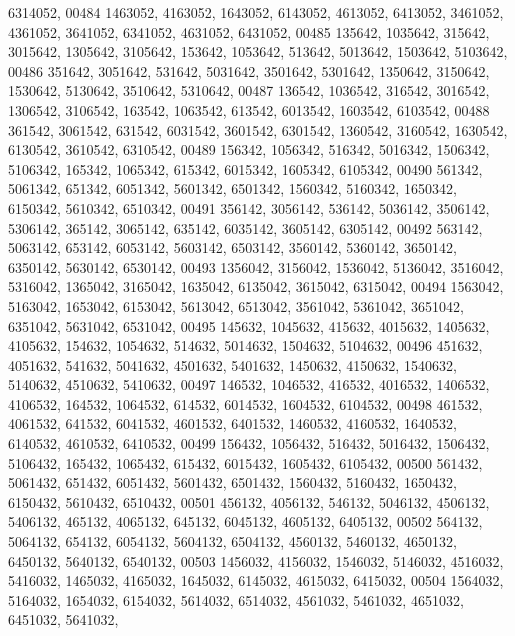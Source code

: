 \begin{DoxyCode}
      6314052,
00484       1463052, 4163052, 1643052, 6143052, 4613052, 6413052, 3461052, 4361052, 3641052, 6341052, 4631052, 
      6431052,
00485        135642, 1035642,  315642, 3015642, 1305642, 3105642,  153642, 1053642,  513642, 5013642, 1503642, 
      5103642,
00486        351642, 3051642,  531642, 5031642, 3501642, 5301642, 1350642, 3150642, 1530642, 5130642, 3510642, 
      5310642,
00487        136542, 1036542,  316542, 3016542, 1306542, 3106542,  163542, 1063542,  613542, 6013542, 1603542, 
      6103542,
00488        361542, 3061542,  631542, 6031542, 3601542, 6301542, 1360542, 3160542, 1630542, 6130542, 3610542, 
      6310542,
00489        156342, 1056342,  516342, 5016342, 1506342, 5106342,  165342, 1065342,  615342, 6015342, 1605342, 
      6105342,
00490        561342, 5061342,  651342, 6051342, 5601342, 6501342, 1560342, 5160342, 1650342, 6150342, 5610342, 
      6510342,
00491        356142, 3056142,  536142, 5036142, 3506142, 5306142,  365142, 3065142,  635142, 6035142, 3605142, 
      6305142,
00492        563142, 5063142,  653142, 6053142, 5603142, 6503142, 3560142, 5360142, 3650142, 6350142, 5630142, 
      6530142,
00493       1356042, 3156042, 1536042, 5136042, 3516042, 5316042, 1365042, 3165042, 1635042, 6135042, 3615042, 
      6315042,
00494       1563042, 5163042, 1653042, 6153042, 5613042, 6513042, 3561042, 5361042, 3651042, 6351042, 5631042, 
      6531042,
00495        145632, 1045632,  415632, 4015632, 1405632, 4105632,  154632, 1054632,  514632, 5014632, 1504632, 
      5104632,
00496        451632, 4051632,  541632, 5041632, 4501632, 5401632, 1450632, 4150632, 1540632, 5140632, 4510632, 
      5410632,
00497        146532, 1046532,  416532, 4016532, 1406532, 4106532,  164532, 1064532,  614532, 6014532, 1604532, 
      6104532,
00498        461532, 4061532,  641532, 6041532, 4601532, 6401532, 1460532, 4160532, 1640532, 6140532, 4610532, 
      6410532,
00499        156432, 1056432,  516432, 5016432, 1506432, 5106432,  165432, 1065432,  615432, 6015432, 1605432, 
      6105432,
00500        561432, 5061432,  651432, 6051432, 5601432, 6501432, 1560432, 5160432, 1650432, 6150432, 5610432, 
      6510432,
00501        456132, 4056132,  546132, 5046132, 4506132, 5406132,  465132, 4065132,  645132, 6045132, 4605132, 
      6405132,
00502        564132, 5064132,  654132, 6054132, 5604132, 6504132, 4560132, 5460132, 4650132, 6450132, 5640132, 
      6540132,
00503       1456032, 4156032, 1546032, 5146032, 4516032, 5416032, 1465032, 4165032, 1645032, 6145032, 4615032, 
      6415032,
00504       1564032, 5164032, 1654032, 6154032, 5614032, 6514032, 4561032, 5461032, 4651032, 6451032, 5641032, 

\end{DoxyCode}
